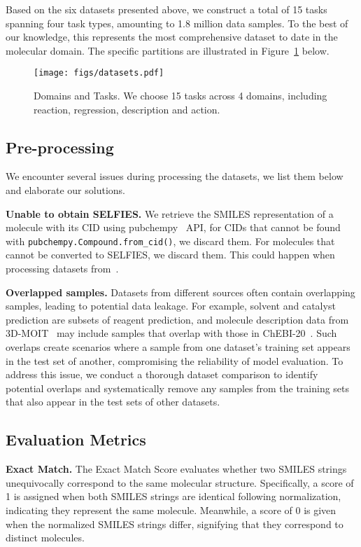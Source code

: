 Based on the six datasets presented above, we construct a total of 15 tasks spanning four task types, amounting to 1.8 million data samples. To the best of our knowledge, this represents the most comprehensive dataset to date in the molecular domain. The specific partitions are illustrated in Figure~\ref{fig:all datasets} below.
\begin{figure}[h]
    \centering
    \texttt{[image: figs/datasets.pdf]}\\[-7pt]
    \caption{\small Domains and Tasks. We choose 15 tasks across 4 domains, including reaction, regression, description and action.}
    \label{fig:all datasets}
\end{figure}


\subsection{Pre-processing}
We encounter several issues during processing the datasets, we list them below and elaborate our solutions.

\noindent\textbf{Unable to obtain SELFIES.} We retrieve the SMILES representation of a molecule with its CID using pubchempy~\cite{PubChemPy} API, for CIDs that cannot be found with \texttt{pubchempy.Compound.from\_cid()}, we discard them. For molecules that cannot be converted to SELFIES, we discard them. This could happen when processing datasets from~\citet{li2024towards}.

\noindent\textbf{Overlapped samples.} 
Datasets from different sources often contain overlapping samples, leading to potential data leakage. For example, solvent and catalyst prediction are subsets of reagent prediction, and molecule description data from 3D-MOIT~\cite{li2024towards} may include samples that overlap with those in ChEBI-20~\cite{edwards2021text2mol}. Such overlaps create scenarios where a sample from one dataset’s training set appears in the test set of another, compromising the reliability of model evaluation. To address this issue, we conduct a thorough dataset comparison to identify potential overlaps and systematically remove any samples from the training sets that also appear in the test sets of other datasets.

\subsection{Evaluation Metrics} 

\textbf{Exact Match.} The Exact Match Score evaluates whether two SMILES strings unequivocally correspond to the same molecular structure. Specifically, a score of 1 is assigned when both SMILES strings are identical following normalization, indicating they represent the same molecule. Meanwhile, a score of 0 is given when the normalized SMILES strings differ, signifying that they correspond to distinct molecules.

